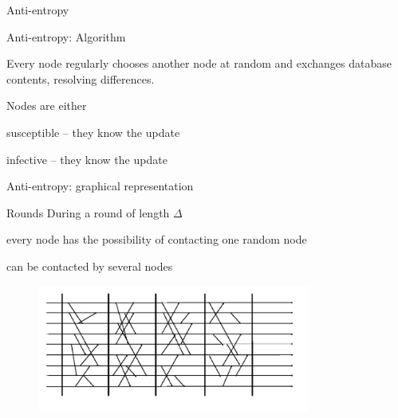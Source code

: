 \begin{frame}{Anti-entropy}
		
\begin{block}{Anti-entropy: Algorithm}
\BIL
\item Every node regularly chooses another node at random and exchanges 
database contents, resolving differences.
\item Nodes are either 
 \BI
 \item \alert{susceptible} -- they know the update
 \item \alert{infective} -- they know the update
 \EI
\EIL
\end{block}

\begin{Procedure}
\caption{Anti-entropy protocol executed by process $p_i$:}
\end{Procedure}

\end{frame}

\begin{frame}{Anti-entropy: graphical representation}
\begin{block}{Rounds}
During a \alert{round} of length $\Delta$
\BI
\item every node has the possibility of contacting one random node
\item can be contacted by several nodes
\EI
\end{block}

\begin{figure}
\includegraphics[width=0.8\textwidth]{rounds}
\end{figure}

\end{frame}

